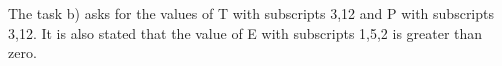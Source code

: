 The task b) asks for the values of T with subscripts 3,12 and P with subscripts 3,12. It is also stated that the value of E with subscripts 1,5,2 is greater than zero.